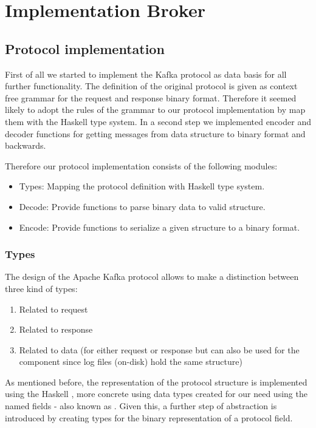 \chapter{Implementation Broker}

\section{Protocol implementation}
\label{sec-protocol}
First of all we started to implement the Kafka protocol 
as data basis for all further functionality. The definition of the original
protocol is given as context free grammar for the request and response binary
format. Therefore it seemed likely to adopt the rules of the grammar to our
protocol implementation by map them with the Haskell type system. In a second
step we implemented encoder and decoder functions for getting messages from data
structure to binary format and backwards. 

Therefore our protocol implementation consists of the following modules: 
\begin{itemize}
    \item {Types: Mapping the protocol definition with Haskell type system. }
    \item {Decode: Provide functions to parse binary data to valid structure. }
    \item {Encode: Provide functions to serialize a given structure to a binary
        format. }
\end{itemize}

\subsection{Types}
The design of the Apache Kafka protocol allows to make a distinction between three kind of types:
\begin{enumerate}
  \item Related to request
  \item Related to response
  \item Related to data (for either request or response but can also be used for the  component since log files (on-disk) hold the same structure)
\end{enumerate}

As mentioned before, the representation of the protocol structure is implemented using the Haskell , more concrete using data types created
for our need using the named fields - also known as . Given this, a
further step of abstraction is introduced by creating types for the binary
representation of a protocol field. 

